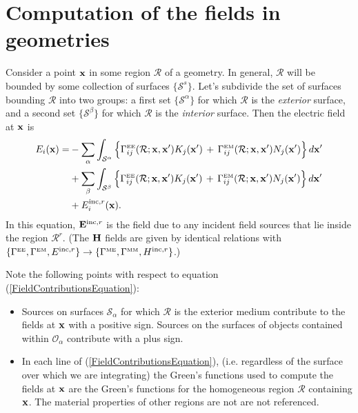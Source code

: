 \documentclass[letterpaper]{article}
\begin{document}
\section{Computation of the fields in \lss geometries}

Consider a point $\mathbf{x}$ in some region $\mathcal{R}$
of a \lss geometry. In general, $\mathcal{R}$
will be bounded by some collection of surfaces
$\{\mathcal{S}^s\}$. Let's subdivide the set of 
surfaces bounding $\mathcal{R}$ into two groups:
a first set $\{\mathcal{S}^\alpha\}$ for which
$\mathcal{R}$ is the \textit{exterior} surface,
and a second set $\{\mathcal{S}^\beta\}$ for which
$\mathcal{R}$ is the \textit{interior} surface.
Then the electric field at $\mathbf{x}$ is
\begin{align} 
E_i(\mathbf{x}) 
    = &-\sum_\alpha \int_{\mathcal{S}^\alpha} 
           \Big\{ \Gamma_{ij}^{\hbox{\tiny{EE}}}(\mathcal{R}; \mathbf{x}, \mathbf{x}^\prime) 
                   K_j(\mathbf{x}^\prime)
                  \,+\,
                   \Gamma_{ij}^{\hbox{\tiny{EM}}}(\mathcal{R}; \mathbf{x}, \mathbf{x}^\prime) 
                   N_j(\mathbf{x}^\prime)
           \Big\} \, d\mathbf{x}^\prime
\nonumber \\
     &+\sum_\beta \int_{\mathcal{S}^\beta} 
           \Big\{ \Gamma_{ij}^{\hbox{\tiny{EE}}}(\mathcal{R}; \mathbf{x}, \mathbf{x}^\prime) 
                   K_j(\mathbf{x}^\prime)
                  \,+\,
                   \Gamma_{ij}^{\hbox{\tiny{EM}}}(\mathcal{R}; \mathbf{x}, \mathbf{x}^\prime) 
                   N_j(\mathbf{x}^\prime)
           \Big\} \, d\mathbf{x}^\prime
\nonumber \\
     &+E^{\text{\scriptsize inc},r}_i(\mathbf{x}).
\label{FieldContributionsEquation}
\end{align}
In this equation, 
$\mathbf{E}^{\text{\scriptsize inc},r}$ is the field due to any 
incident field sources that lie inside the region $\mathcal{R}^r.$
(The $\mathbf{H}$ fields are given by identical relations with 
$\{ \Gamma^{\hbox{\tiny{EE}}}, \Gamma^{\hbox{\tiny{EM}}}, E^{\text{\scriptsize inc},r}\}  \to 
 \{ \Gamma^{\hbox{\tiny{ME}}}, \Gamma^{\hbox{\tiny{MM}}}, H^{\text{\scriptsize inc},r}\}$.)

Note the following points with respect to equation
(\ref{FieldContributionsEquation}):
\begin{itemize}
  \item Sources on surfaces $\mathcal{S}_\alpha$ for which
        $\mathcal{R}$ is the exterior medium  
        contribute to the fields at $\mathbf{x}$ 
        with a positive sign.
        Sources on the surfaces of objects contained within 
        $\mathcal{O}_\alpha$ contribute with a plus sign.

  \item In each line of (\ref{FieldContributionsEquation}), 
        (i.e. regardless of the surface over which we are 
        integrating) the Green's functions used to compute
        the fields at $\mathbf{x}$ are the Green's functions for
        the homogeneous region $\mathcal{R}$ containing $\mathbf{x}$.
        The material properties of other regions are not
        are not referenced.
\end{itemize}
\end{document}
